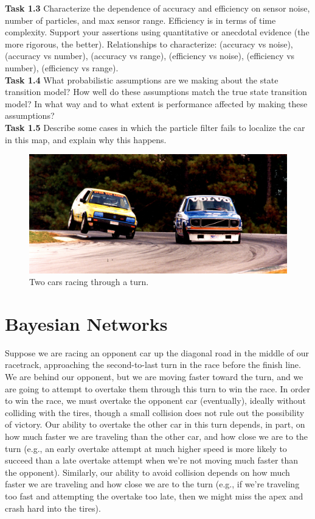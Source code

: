 \documentclass[a4paper]{article}
\theoremstyle{definition}
\theoremstyle{plain}
\begin{document}
\noindent
\textbf{Task 1.3} Characterize the dependence of accuracy and efficiency on sensor noise, number of particles, and max sensor range. Efficiency is in terms of time complexity. Support your assertions using quantitative or anecdotal evidence (the more rigorous, the better). Relationships to characterize: (accuracy vs noise), (accuracy vs number), (accuracy vs range), (efficiency vs noise), (efficiency vs number), (efficiency vs range).\\

\noindent
\textbf{Task 1.4} What probabilistic assumptions are we making about the state transition model? How well do these assumptions match the true state transition model? In what way and to what extent is performance affected by making these assumptions?\\

\noindent
\textbf{Task 1.5} Describe some cases in which the particle filter fails to localize the car in this map, and explain why this happens.\\

\begin{figure}[b!]
    \centering
    \includegraphics[scale=0.4]{images/overtake.jpg}
    \caption{Two cars racing through a turn.}
    \label{fig:overtake}
\end{figure}

\section{Bayesian Networks}

Suppose we are racing an opponent car up the diagonal road in the middle of our racetrack, approaching the second-to-last turn in the race before the finish line. We are behind our opponent, but we are moving faster toward the turn, and we are going to attempt to overtake them through this turn to win the race. In order to win the race, we must overtake the opponent car (eventually), ideally without colliding with the tires, though a small collision does not rule out the possibility of victory. Our ability to overtake the other car in this turn depends, in part, on how much faster we are traveling than the other car, and how close we are to the turn (e.g., an early overtake attempt at much higher speed is more likely to succeed than a late overtake attempt when we're not moving much faster than the opponent). Similarly, our ability to avoid collision depends on how much faster we are traveling and how close we are to the turn (e.g., if we're traveling too fast and attempting the overtake too late, then we might miss the apex and crash hard into the tires).\\
\end{document}
